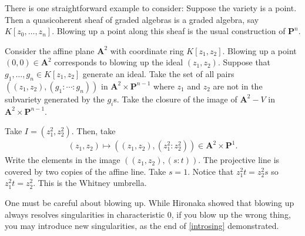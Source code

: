 \documentclass [11 pt, oneside] {article}
\begin{document}
There is one straightforward example to consider: Suppose the variety is a point. Then a quasicoherent sheaf of graded algebras is a graded algebra, say $K[z_0,\hdots,z_n]$. Blowing up a point along this sheaf is the usual construction of $\mathbf{P}^n$.

\begin{example}[ ]\label{introsing}\text{}
Consider the affine plane $\mathbf{A}^2$ with coordinate ring $K[z_1,z_2]$. Blowing up a point $(0,0)\in  \mathbf{A}^2$ corresponds to blowing up the ideal $(z_1,z_2)$. Suppose that $g_1,\hdots, g_n\in K[z_1,z_2]$ generate an ideal. Take the set of all pairs $((z_1,z_2), (g_1:\cdots:g_n))$ in $\mathbf{A}^2\times \mathbf{P}^{n-1}$ where $z_1$ and $z_2$ are not in the subvariety generated by the $g_i$s. Take the closure of the image of $\mathbf{A}^2- V$ in $\mathbf{A}^2\times \mathbf{P}^{n-1}$.

Take $I=(z_1^2,z_2^2)$. Then, take 
\begin{align*}
	(z_1,z_2)\longmapsto  ((z_1,z_2), (z_1^2:z_2^2)) \in \mathbf{A}^2\times \mathbf{P}^1.
\end{align*}
Write the elements in the image $((z_1,z_2),  (s:t))$. The projective line is covered by two copies of the affine line. Take $s=1$. Notice that $z_1^2t = z_2^2s$ so $z_1^2t=z_2^2$. This is the Whitney umbrella.
\end{example}

\begin{warn}
	One must be careful about blowing up. While Hironaka showed that blowing up always resolves singularities in characteristic $0$, if you blow up the wrong thing, you may introduce new singularities, as the end of \cref{introsing} demonstrated.
\end{warn}
\end{document}

